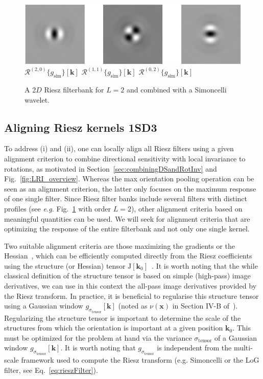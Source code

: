 \documentclass[fleqn,a4paper,oneside,openany]{book}
\newcommand\id[1]{{\hfill\normalsize{\idfont #1}}}
\renewcommand{\marginnote}[2][]{}
\begin{document}
%
\begin{figure}
\centering
\includegraphics[trim = 0 0 0 0, clip, width=0.7\linewidth]{Riesz.png}\\
$\mathcal{R}^{(2,0)}
\{g_{\text{sim}}\}[\boldsymbol{k}]$
\hspace{1.3cm}
$\mathcal{R}^{(1,1)}
\{g_{\text{sim}}\}[\boldsymbol{k}]$
\hspace{1.3cm}
$\mathcal{R}^{(0,2)}
\{g_{\text{sim}}\}[\boldsymbol{k}]$
\caption{A 2$D$ Riesz filterbank for $L=2$ and combined with a Simoncelli wavelet.}
  \label{fig:Riesz}
\end{figure}
%
\subsection[Aligning Riesz kernels]{Aligning Riesz kernels \id{1SD3}}\label{sec:RieszAlignment}
\marginnote{\footnotesize v6: Additional clarifications on how to align Riesz kernels were provided.}
To address (i) and (ii), one can locally align all Riesz filters using a given alignment criterion to combine directional sensitivity with local invariance to rotations, as motivated in Section~\ref{sec:combiningDSandRotInv} and Fig.~\ref{fig:LRI_overview}.
Whereas the max orientation pooling operation can be seen as an alignment criterion, the latter only focuses on the maximum response of one single filter.
Since Riesz filter banks include several filters with distinct profiles (see \textit{e.g.} Fig.~\ref{fig:Riesz} with order $L=2$), other alignment criteria based on meaningful quantities can be used.
We will seek for alignment criteria that are optimizing the response of the entire filterbank and not only one single kernel.

Two suitable alignment criteria are those maximizing the gradients or the Hessian~\cite{DMP2017}, which can be efficiently computed directly from the Riesz coefficients using the structure (or Hessian) tensor $\mathrm{J}[\boldsymbol{k}_0]$~\cite{ChU2012}.
It is worth noting that the while classical definition of the structure tensor is based on simple (high-pass) image derivatives, we can use in this context the all-pass image derivatives provided by the Riesz transform.
In practice, it is beneficial to regularise this structure tensor using a Gaussian window $g_{\sigma_{\text{tensor}}}[\boldsymbol{k}]$ (noted as $\nu(\boldsymbol{x})$ in Section IV-B of~\cite{ChU2012}).
Regularizing the structure tensor is important to determine the scale of the structures from which the orientation is important at a given position $\boldsymbol{k}_0$.
This must be optimized for the problem at hand via the variance $\sigma_{\text{tensor}}$ of a Gaussian window $g_{\sigma_{\text{tensor}}}[\boldsymbol{k}]$.
It is worth noting that $g_{\sigma_{\text{tensor}}}$ is independent from the multi-scale framework used to compute the Riesz transform (e.g. Simoncelli or the LoG filter, see Eq.~\eqref{eq:rieszFilter}). 
\end{document}
